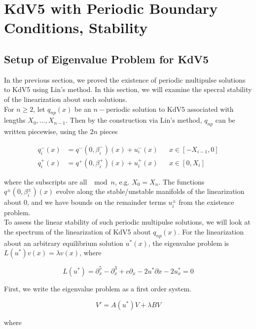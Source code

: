 \documentclass[12pt]{article}
\begin{document}
\section{KdV5 with Periodic Boundary Conditions, Stability}

\subsection{Setup of Eigenvalue Problem for KdV5}

In the previous section, we proved the existence of periodic multipulse solutions to KdV5 using Lin's method. In this section, we will examine the specral stability of the linearization about such solutions.\\

For $n \geq 2$, let $q_{np}(x)$ be an $n-$periodic solution to KdV5 associated with lengths $X_0, \dots, X_{n-1}$. Then by the construction via Lin's method, $q_{np}$ can be written piecewise, using the $2n$ pieces

\begin{align*}
q_i^-(x) &= q^-(0, \beta_i^-)(x) + u_i^-(x) && x \in [-X_{i-1}, 0]\\
q_i^+(x) &= q^+(0, \beta_i^+)(x) + u_i^+(x) && x \in [0, X_i]
\end{align*}

where the subscripts are all $\mod n$, e.g. $X_0 = X_n$. The functions $q^\pm(0, \beta_i^\pm)(x)$ evolve along the stable/unstable manifolds of the linearization about 0, and we have bounds on the remainder terms $u_i^\pm$ from the existence problem.\\

To assess the linear stability of such periodic multipulse solutions, we will look at the spectrum of the linearization of KdV5 about $q_{np}(x)$. For the linearization about an arbitrary equilibrium solution $u^*(x)$, the eigenvalue problem is $L(u^*) v(x) = \lambda v(x)$, where

\begin{equation}
L(u^*) = \partial_x^5 - \partial_x^3 + c \partial_x - 2 u^* \partial x - 2 u^*_x = 0
\end{equation}

First, we write the eigenvalue problem as a first order system.

\begin{equation}
V' = A(u^*)V + \lambda B V
\end{equation}

where
\end{document}
